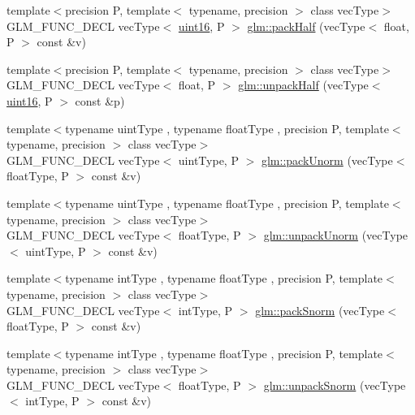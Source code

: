 \begin{DoxyCompactItemize}
\item 
{\footnotesize template$<$precision P, template$<$ typename, precision $>$ class vec\+Type$>$ }\\G\+L\+M\+\_\+\+F\+U\+N\+C\+\_\+\+D\+E\+CL vec\+Type$<$ \hyperlink{group__gtc__type__precision_gad8c2939e1fdd8e5828b31d95c52255d5}{uint16}, P $>$ \hyperlink{group__gtc__packing_ga896d806b72e390eb953786cca3632ec9}{glm\+::pack\+Half} (vec\+Type$<$ float, P $>$ const \&v)
\item 
{\footnotesize template$<$precision P, template$<$ typename, precision $>$ class vec\+Type$>$ }\\G\+L\+M\+\_\+\+F\+U\+N\+C\+\_\+\+D\+E\+CL vec\+Type$<$ float, P $>$ \hyperlink{group__gtc__packing_gaf3f9387834f8d8beadfe723c1dd247a7}{glm\+::unpack\+Half} (vec\+Type$<$ \hyperlink{group__gtc__type__precision_gad8c2939e1fdd8e5828b31d95c52255d5}{uint16}, P $>$ const \&p)
\item 
{\footnotesize template$<$typename uint\+Type , typename float\+Type , precision P, template$<$ typename, precision $>$ class vec\+Type$>$ }\\G\+L\+M\+\_\+\+F\+U\+N\+C\+\_\+\+D\+E\+CL vec\+Type$<$ uint\+Type, P $>$ \hyperlink{group__gtc__packing_gacb9a3df68172c1193c9d701a3fa4d88b}{glm\+::pack\+Unorm} (vec\+Type$<$ float\+Type, P $>$ const \&v)
\item 
{\footnotesize template$<$typename uint\+Type , typename float\+Type , precision P, template$<$ typename, precision $>$ class vec\+Type$>$ }\\G\+L\+M\+\_\+\+F\+U\+N\+C\+\_\+\+D\+E\+CL vec\+Type$<$ float\+Type, P $>$ \hyperlink{group__gtc__packing_gad3d7e1ec7fcfb7ae341658e2ce1c3bd9}{glm\+::unpack\+Unorm} (vec\+Type$<$ uint\+Type, P $>$ const \&v)
\item 
{\footnotesize template$<$typename int\+Type , typename float\+Type , precision P, template$<$ typename, precision $>$ class vec\+Type$>$ }\\G\+L\+M\+\_\+\+F\+U\+N\+C\+\_\+\+D\+E\+CL vec\+Type$<$ int\+Type, P $>$ \hyperlink{group__gtc__packing_ga1be760860697db386b36513aeafe9d5e}{glm\+::pack\+Snorm} (vec\+Type$<$ float\+Type, P $>$ const \&v)
\item 
{\footnotesize template$<$typename int\+Type , typename float\+Type , precision P, template$<$ typename, precision $>$ class vec\+Type$>$ }\\G\+L\+M\+\_\+\+F\+U\+N\+C\+\_\+\+D\+E\+CL vec\+Type$<$ float\+Type, P $>$ \hyperlink{group__gtc__packing_ga63eeec0d416e48462f341f4a7a9a45fe}{glm\+::unpack\+Snorm} (vec\+Type$<$ int\+Type, P $>$ const \&v)

\end{DoxyCompactItemize}
